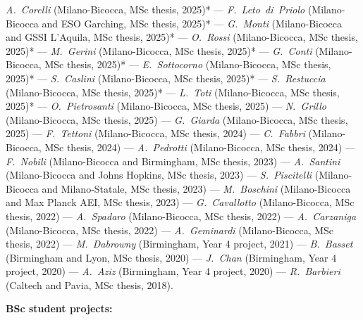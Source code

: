 \textit{\textit{A.~Corelli}} (Milano-Bicocca, MSc thesis, 2025)* --- 
\textit{\textit{F.~Leto~di~Priolo}} (Milano-Bicocca and ESO Garching, MSc thesis, 2025)* --- 
\textit{\textit{G.~Monti}} (Milano-Bicocca and GSSI L'Aquila, MSc thesis, 2025)* --- 
\textit{\textit{O.~Rossi}} (Milano-Bicocca, MSc thesis, 2025)* --- 
\textit{\textit{M.~Gerini}} (Milano-Bicocca, MSc thesis, 2025)* --- 
\textit{\textit{G.~Conti}} (Milano-Bicocca, MSc thesis, 2025)* --- 
\textit{\textit{E.~Sottocorno}} (Milano-Bicocca, MSc thesis, 2025)* --- 
\textit{\textit{S.~Caslini}} (Milano-Bicocca, MSc thesis, 2025)* --- 
\textit{\textit{S.~Restuccia}} (Milano-Bicocca, MSc thesis, 2025)* --- 
\textit{\textit{L.~Toti}} (Milano-Bicocca, MSc thesis, 2025)* --- 
\textit{\textit{O.~Pietrosanti}} (Milano-Bicocca, MSc thesis, 2025) --- 
\textit{\textit{N.~Grillo}} (Milano-Bicocca, MSc thesis, 2025) --- 
\textit{\textit{G.~Giarda}} (Milano-Bicocca, MSc thesis, 2025) --- 
\textit{\textit{F.~Tettoni}} (Milano-Bicocca, MSc thesis, 2024) --- 
\textit{\textit{C.~Fabbri}} (Milano-Bicocca, MSc thesis, 2024) --- 
\textit{\textit{A.~Pedrotti}} (Milano-Bicocca, MSc thesis, 2024) --- 
\textit{\textit{F.~Nobili}} (Milano-Bicocca and Birmingham, MSc thesis, 2023) --- 
\textit{\textit{A.~Santini}} (Milano-Bicocca and Johns Hopkins, MSc thesis, 2023) --- 
\textit{\textit{S.~Piscitelli}} (Milano-Bicocca and Milano-Statale, MSc thesis, 2023) --- 
\textit{\textit{M.~Boschini}} (Milano-Bicocca and Max Planck AEI, MSc thesis, 2023) --- 
\textit{\textit{G.~Cavallotto}} (Milano-Bicocca, MSc thesis, 2022) --- 
\textit{\textit{A.~Spadaro}} (Milano-Bicocca, MSc thesis, 2022) --- 
\textit{\textit{A.~Carzaniga}} (Milano-Bicocca, MSc thesis, 2022) --- 
\textit{\textit{A.~Geminardi}} (Milano-Bicocca, MSc thesis, 2022) --- 
\textit{\textit{M.~Dabrowny}} (Birmingham, Year 4 project, 2021) --- 
\textit{\textit{B.~Basset}} (Birmingham and Lyon, MSc thesis, 2020) --- 
\textit{\textit{J.~Chan}} (Birmingham, Year 4 project, 2020) --- 
\textit{\textit{A.~Aziz}} (Birmingham, Year 4 project, 2020) --- 
\textit{\textit{R.~Barbieri}} (Caltech and Pavia, MSc thesis, 2018).

\vspace{0.2cm}
\textbf{BSc student projects:}

